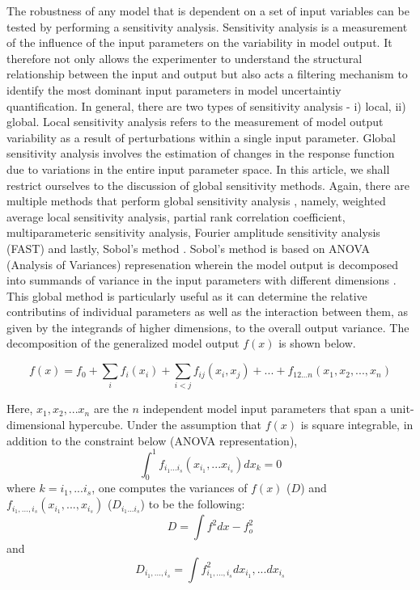 \documentclass[prb,superscriptaddress,amsmath]{revtex4}
\begin{document}
The robustness of any model that is dependent on a set of input variables can be tested by performing a sensitivity analysis.
Sensitivity analysis is a measurement of the influence of the input parameters
on the variability in model output. It therefore not only allows the experimenter to
understand the structural relationship between the input and output but also
acts a filtering mechanism to identify the most dominant input parameters 
in model uncertaintiy quantification.
In general, there are two types of sensitivity analysis - i) local, ii) global.
Local sensitivity analysis refers to the measurement of model output
variability as a result of perturbations within a single input parameter.
Global sensitivity analysis involves the estimation of changes in the response
function due to variations in the entire input parameter space.
In this article, we shall restrict ourselves to the discussion of global
sensitivity methods. Again, there are multiple methods that perform  global
sensitivity analysis \cite{Saltelli07a}, namely, weighted average local sensitivity analysis,  partial
rank correlation coefficient, multiparameteric sensitivity  analysis, Fourier
amplitude sensitivity analysis (FAST) \cite{Saltelli99a, Chan97a} and lastly, Sobol's method
\cite{Sobol01a, Saltelli02a, Saltelli10a}. 
Sobol's method is based on ANOVA (Analysis of Variances) represenation wherein
the model output is decomposed into summands of
variance in the  input parameters with different dimensions \cite{Sobol90a}. This global method 
is particularly useful as it can determine the relative contributins of
individual parameters as well as the interaction between them, as given by
the integrands of higher dimensions, to the overall output variance.
The decomposition of the generalized model output $f(x)$ is shown below.

\begin{equation}
f(x) = f_0 + \sum_i f_i(x_i) + \sum_{i < j} f_{ij}(x_i, x_j) + ... + f_{12
...n} (x_1, x_2, ..., x_n)
\end{equation}

Here, $x_1, x_2, ... x_n$ are the $n$ independent model input parameters that
span a unit-dimensional hypercube. 
Under the assumption that $f(x)$ is square integrable, in addition to the constraint
below (ANOVA representation), 
\begin{equation}
\int_{0}^{1} f_{i_1 ...i_s} (x_{i_1},...x_{i_s}) dx_k = 0
\label{ANOVA}
\end{equation}
 where $k = i_1, ... i_s$, one computes the variances of $f(x)$ ($D$) and $f_{i_1, ... , i_s} (x_{i_1}, ...,
x_{i_s})$ ($D_{i_1 ... i_s}$) to be the following:
\newline
\begin{equation}
D = \int f^2 dx - f_o^2
\end{equation}
and
\begin{equation}
D_{i_1, ..., i_s} = \int f^2_{i_1, ..., i_s} dx_{i_1}, ... dx_{i_s}
\end{equation}
\end{document}
